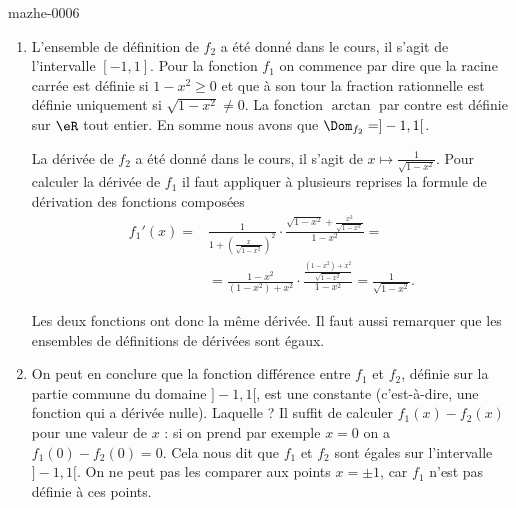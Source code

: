 

\begin{corrige}{mazhe-0006}

  \begin{enumerate}
  \item L'ensemble de définition de $f_2$ a été donné dans le cours, il s'agit de l'intervalle $[-1,1]$. Pour la fonction $f_1$ on commence par dire que la racine carrée est définie si $1-x^2 \geq 0$ et que à son tour la fraction rationnelle est définie uniquement si $\sqrt{1-x^2}\neq 0$. La fonction $\arctan$ par contre est définie sur $\eR$ tout entier. En somme nous avons que $\Dom_{f_2} = ]-1,1[$.

La dérivée de  $f_2$ a été donné dans le cours, il s'agit de $\displaystyle x\mapsto \frac{1}{\sqrt{1-x^2}}$. Pour calculer la dérivée de $f_1$ il faut appliquer à plusieurs reprises la formule de dérivation des fonctions composées
\begin{equation*}
  \begin{aligned}
    f_1' (x) = &\frac{1}{1+\left(\frac{x}{\sqrt{1-x^2}}\right)^2} \cdot \frac{\sqrt{1-x^2} + \frac{x^2}{\sqrt{1-x^2}}}{1-x^2} = \\
    &= \frac{1-x^2}{(1-x^2) +x^2}\cdot\frac{\frac{(1-x^2) +x^2}{\sqrt{1-x^2}}}{1-x^2} =\frac{1}{\sqrt{1-x^2}}.
  \end{aligned}
\end{equation*}

Les deux fonctions ont donc la m\^eme dérivée. Il faut aussi remarquer que les ensembles de définitions de dérivées sont égaux. 
  \item On peut en conclure que la fonction différence entre $f_1$ et $f_2$, définie sur la partie commune du domaine $]-1,1[$,  est une constante (c'est-à-dire, une fonction qui a dérivée nulle). Laquelle ? Il suffit de calculer $f_1(x)-f_2(x)$ pour une valeur de $x$ : si on prend par exemple $x =0$ on a $f_1(0) -f_2(0) =0$. Cela nous dit que $f_1$ et $f_2$ sont égales sur l'intervalle $]-1,1[$. On ne peut pas les comparer aux points $x = \pm 1$, car $f_1$ n'est pas définie à ces points.
  \end{enumerate}
\end{corrige}
